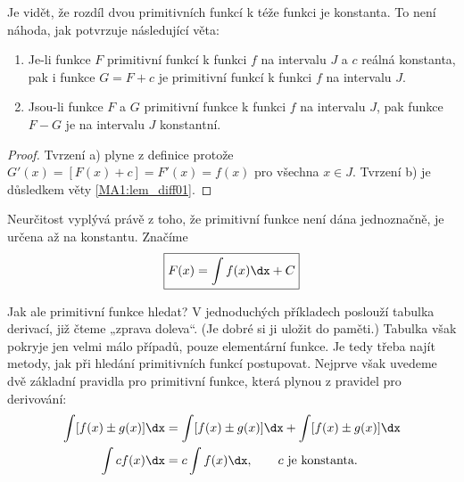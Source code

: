     Je vidět, že rozdíl dvou primitivních funkcí k téže funkci je konstanta. To není náhoda, jak 
    potvrzuje následující věta:
    
    \begin{lemma}
      \begin{enumerate}[noitemsep]
        \item Je-li funkce $F$ primitivní funkcí k funkci \(f\) na intervalu \(J\) a \(c\) reálná  
              konstanta, pak i funkce $G = F + c$ je primitivní funkcí k funkci \(f\) na intervalu 
              \(J\).
        \item Jsou-li funkce $F$ a $G$ primitivní funkce k funkci \(f\) na intervalu \(J\), pak 
        funkce
              $F-G$ je na intervalu \(J\) konstantní.
      \end{enumerate} 
      \begin{proof}
        Tvrzení a) plyne z definice protože $G'(x) = [F(x) + c] = F'(x) = f(x)$ pro všechna $x\in
        J$. Tvrzení b) je důsledkem věty \ref{MA1:lem_diff01}.
      \end{proof}
    \end{lemma}
    Neurčitost vyplývá právě z toho, že primitivní funkce není dána jednoznačně, je určena až na 
    konstantu. Značíme
    \begin{equation*}
      \boxed{F(x) = \int f(x)\dx + C}
    \end{equation*}
        
    Jak ale primitivní funkce hledat? V jednoduchých příkladech poslouží tabulka derivací, již 
    čteme „zprava doleva“. (Je dobré si ji uložit do paměti.) Tabulka však pokryje jen velmi málo 
    případů, pouze elementární funkce. Je tedy třeba najít metody, jak při hledání primitivních 
    funkcí postupovat. Nejprve však uvedeme dvě základní pravidla pro primitivní funkce, která 
    plynou z pravidel pro derivování:
    \begin{align}
      \int[f(x)\pm g(x)]\dx &= \int[f(x)\pm g(x)]\dx + \int[f(x)\pm g(x)]\dx \label{MA1:eq_int10} \\
      \int cf(x)\dx         &= c \int f(x)\dx, \qquad \text{\(c\) je konstanta.} \label{MA1:eq_int11}
    \end{align}
  
